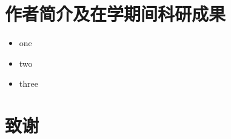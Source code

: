 \documentclass[twoside,a4paper,12pt]{article}
\begin{document}
\begin{CJK}{UTF8}{gbsn}
\newpage
\renewcommand\refname{\center{\textbf{参考文献}}}








\newpage
{\centering\section*{作者简介及在学期间科研成果}}


\begin{itemize}
  \item  one 
    \item  two
    \item  three
\end{itemize}

\newpage
{\centering\section*{致谢}}


\end{CJK}
\end{document}

